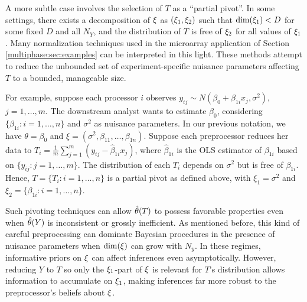A more subtle case involves the selection of $T$ as a ``partial pivot''.
In some settings, there exists a decomposition of $\xi$ as $(\xi_1, \xi_2)$ such that $\dim(\xi_1) < D$ for some fixed $D$ and all $N_Y$, and the distribution of $T$ is free of  $\xi_2$ for all values of $\xi_1$.
Many normalization techniques used in the microarray application of Section \ref{multiphase:sec:examples} can be interpreted in this light.
These methods attempt to reduce the unbounded set of experiment-specific nuisance parameters affecting $T$ to a bounded, manageable size.

For example, suppose each processor $i$ observes $y_{ij} \sim N(\beta_0 + \beta_{1i} x_j, \sigma^2)$, $j=1 ,\ldots ,m$.
The downstream analyst wants to estimate $\beta_0$, considering $\{\beta_{1i} : i=1 ,\ldots ,n\}$ and $\sigma^2$ as nuisance parameters.
In our previous notation, we have $\theta = \beta_0$ and $\xi = \left( \sigma^2, \beta_{11}, \ldots, \beta_{1n} \right)$.
Suppose each preprocessor reduces her data to $T_i = \frac{1}{m} \sum_{j=1}^{m} (y_{ij} - \hat{\beta}_{1i} x_j)$, where $\hat{\beta}_{1i}$ is the OLS estimator of $\beta_{1i}$ based on $\{y_{ij} : j=1 ,\ldots ,m\}$.
The distribution of each $T_i$ depends on $\sigma^2$ but is free of $\beta_{1i}$.
Hence, $T = \{T_i : i=1, \ldots ,n\}$ is a partial pivot as defined above, with $\xi_1 = \sigma^2$ and $\xi_2 = \{\beta_{1i} : i=1, \ldots, n\}$.

Such pivoting techniques can allow $\hat{\theta}(T)$ to possess favorable properties even when $\hat{\theta}(Y)$ is inconsistent or grossly inefficient.
As mentioned before, this kind of careful preprocessing can dominate Bayesian procedures in the presence of nuisance parameters when $\dim(\xi)$ can grow with $N_y$.
In these regimes, informative priors on $\xi$ can affect inferences even asymptotically.
However, reducing $Y$ to $T$ so only the $\xi_{1}$-part of $\xi$ is relevant for $T$'s distribution allows information to accumulate on $\xi_1$, making inferences far more robust to the preprocessor's beliefs about $\xi$.


